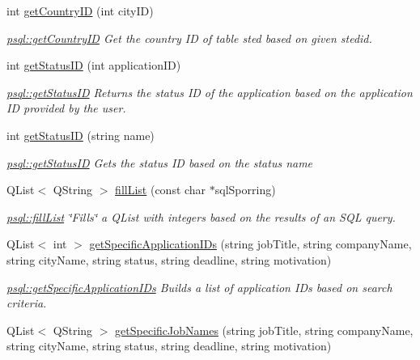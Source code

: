 \begin{DoxyCompactItemize}
int \hyperlink{classpsql_a81d02dc0350ba11d90257914078ba432}{get\+Country\+ID} (int city\+ID)
\begin{DoxyCompactList}\small\item\em \hyperlink{classpsql_a81d02dc0350ba11d90257914078ba432}{psql\+::get\+Country\+ID} Get the country ID of table sted based on given stedid. \end{DoxyCompactList}\item 
int \hyperlink{classpsql_a9c02c92c09cb60c35d24375673b7df06}{get\+Status\+ID} (int application\+ID)
\begin{DoxyCompactList}\small\item\em \hyperlink{classpsql_a9c02c92c09cb60c35d24375673b7df06}{psql\+::get\+Status\+ID} Returns the status ID of the application based on the application ID provided by the user. \end{DoxyCompactList}\item 
int \hyperlink{classpsql_a9d13aebcb6d151719769207238865e75}{get\+Status\+ID} (string name)
\begin{DoxyCompactList}\small\item\em \hyperlink{classpsql_a9c02c92c09cb60c35d24375673b7df06}{psql\+::get\+Status\+ID} Gets the status ID based on the status name \end{DoxyCompactList}\item 
Q\+List$<$ Q\+String $>$ \hyperlink{classpsql_a2ad41caea89dc5af0b55b12f6394fbf5}{fill\+List} (const char $\ast$sql\+Sporring)
\begin{DoxyCompactList}\small\item\em \hyperlink{classpsql_a2ad41caea89dc5af0b55b12f6394fbf5}{psql\+::fill\+List} \char`\"{}\+Fills\char`\"{} a Q\+List with integers based on the results of an S\+QL query. \end{DoxyCompactList}\item 
Q\+List$<$ int $>$ \hyperlink{classpsql_ab6edb8a2e42d8ac7c4ae29f5b0cb494f}{get\+Specific\+Application\+I\+Ds} (string job\+Title, string company\+Name, string city\+Name, string status, string deadline, string motivation)
\begin{DoxyCompactList}\small\item\em \hyperlink{classpsql_ab6edb8a2e42d8ac7c4ae29f5b0cb494f}{psql\+::get\+Specific\+Application\+I\+Ds} Builds a list of application I\+Ds based on search criteria. \end{DoxyCompactList}\item 
Q\+List$<$ Q\+String $>$ \hyperlink{classpsql_a029f2ef38c4156cc6c67765900c8245f}{get\+Specific\+Job\+Names} (string job\+Title, string company\+Name, string city\+Name, string status, string deadline, string motivation)

\end{DoxyCompactItemize}
